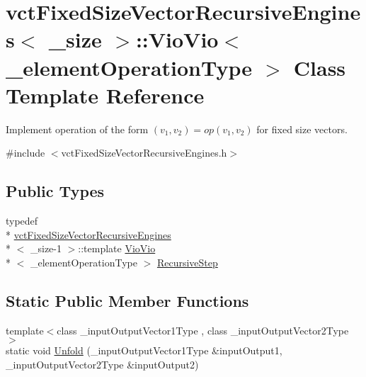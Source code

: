 \hypertarget{classvct_fixed_size_vector_recursive_engines_1_1_vio_vio}{\section{vct\-Fixed\-Size\-Vector\-Recursive\-Engines$<$ \-\_\-size $>$\-:\-:Vio\-Vio$<$ \-\_\-element\-Operation\-Type $>$ Class Template Reference}
\label{classvct_fixed_size_vector_recursive_engines_1_1_vio_vio}
}


Implement operation of the form $(v_{1}, v_{2}) = op(v_{1}, v_{2})$ for fixed size vectors.  




{\ttfamily \#include $<$vct\-Fixed\-Size\-Vector\-Recursive\-Engines.\-h$>$}

\subsection*{Public Types}
\begin{DoxyCompactItemize}
\item 
typedef \\*
\hyperlink{classvct_fixed_size_vector_recursive_engines}{vct\-Fixed\-Size\-Vector\-Recursive\-Engines}\\*
$<$ \-\_\-size-\/1 $>$\-::template \hyperlink{classvct_fixed_size_vector_recursive_engines_1_1_vio_vio}{Vio\-Vio}\\*
$<$ \-\_\-element\-Operation\-Type $>$ \hyperlink{classvct_fixed_size_vector_recursive_engines_1_1_vio_vio_a90191766e286b1e089653e847b102a73}{Recursive\-Step}
\end{DoxyCompactItemize}
\subsection*{Static Public Member Functions}
\begin{DoxyCompactItemize}
\item 
{\footnotesize template$<$class \-\_\-input\-Output\-Vector1\-Type , class \-\_\-input\-Output\-Vector2\-Type $>$ }\\static void \hyperlink{classvct_fixed_size_vector_recursive_engines_1_1_vio_vio_aae5514f2d9b1fd021b82c69773d91b3a}{Unfold} (\-\_\-input\-Output\-Vector1\-Type \&input\-Output1, \-\_\-input\-Output\-Vector2\-Type \&input\-Output2)
\end{DoxyCompactItemize}


